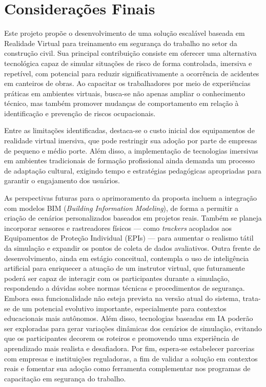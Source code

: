 \chapter{Considerações Finais}
\label{cap:consideracoes}

Este projeto propõe o desenvolvimento de uma solução escalável baseada em Realidade Virtual para treinamento em segurança do trabalho no setor da construção civil. Sua principal contribuição consiste em oferecer uma alternativa tecnológica capaz de simular situações de risco de forma controlada, imersiva e repetível, com potencial para reduzir significativamente a ocorrência de acidentes em canteiros de obras. Ao capacitar os trabalhadores por meio de experiências práticas em ambientes virtuais, busca-se não apenas ampliar o conhecimento técnico, mas também promover mudanças de comportamento em relação à identificação e prevenção de riscos ocupacionais.

Entre as limitações identificadas, destaca-se o custo inicial dos equipamentos de realidade virtual imersiva, que pode restringir sua adoção por parte de empresas de pequeno e médio porte. Além disso, a implementação de tecnologias imersivas em ambientes tradicionais de formação profissional ainda demanda um processo de adaptação cultural, exigindo tempo e estratégias pedagógicas apropriadas para garantir o engajamento dos usuários.

As perspectivas futuras para o aprimoramento da proposta incluem a integração com modelos BIM (\textit{Building Information Modeling}), de forma a permitir a criação de cenários personalizados baseados em projetos reais. Também se planeja incorporar sensores e rastreadores físicos --- como \textit{trackers} acoplados aos Equipamentos de Proteção Individual (EPIs) --- para aumentar o realismo tátil da simulação e expandir os pontos de coleta de dados avaliativos. Outra frente de desenvolvimento, ainda em estágio conceitual, contempla o uso de inteligência artificial para enriquecer a atuação de um instrutor virtual, que futuramente poderá ser capaz de interagir com os participantes durante a simulação, respondendo a dúvidas sobre normas técnicas e procedimentos de segurança. Embora essa funcionalidade não esteja prevista na versão atual do sistema, trata-se de um potencial evolutivo importante, especialmente para contextos educacionais mais autônomos. Além disso, tecnologias baseadas em IA poderão ser exploradas para gerar variações dinâmicas dos cenários de simulação, evitando que os participantes decorem os roteiros e promovendo uma experiência de aprendizado mais realista e desafiadora. Por fim, espera-se estabelecer parcerias com empresas e instituições reguladoras, a fim de validar a solução em contextos reais e fomentar sua adoção como ferramenta complementar nos programas de capacitação em segurança do trabalho.
